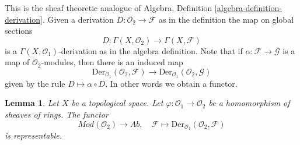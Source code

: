 \documentclass{stacks-project}
\theoremstyle{plain}
\newtheorem{lemma}[subsection]{Lemma}
\theoremstyle{definition}
\theoremstyle{remark}
\numberwithin{equation}{subsection}
\begin{document}
\noindent
This is the sheaf theoretic analogue of
Algebra, Definition \ref{algebra-definition-derivation}.
Given a derivation $D : \mathcal{O}_2 \to \mathcal{F}$
as in the definition the map on global sections
$$
D : \Gamma(X, \mathcal{O}_2) \longrightarrow \Gamma(X, \mathcal{F})
$$
is a $\Gamma(X, \mathcal{O}_1)$-derivation as in the algebra definition.
Note that if $\alpha : \mathcal{F} \to \mathcal{G}$ is a map of
$\mathcal{O}_2$-modules, then there is an induced map
$$
\text{Der}_{\mathcal{O}_1}(\mathcal{O}_2, \mathcal{F})
\longrightarrow
\text{Der}_{\mathcal{O}_1}(\mathcal{O}_2, \mathcal{G})
$$
given by the rule $D \mapsto \alpha \circ D$. In other words
we obtain a functor.

\begin{lemma}
\label{lemma-universal-module}
Let $X$ be a topological space. Let $\varphi : \mathcal{O}_1 \to \mathcal{O}_2$
be a homomorphism of sheaves of rings. The functor
$$
\textit{Mod}(\mathcal{O}_2) \longrightarrow \textit{Ab}, \quad
\mathcal{F} \longmapsto \text{Der}_{\mathcal{O}_1}(\mathcal{O}_2, \mathcal{F})
$$
is representable.
\end{lemma}
\end{document}
